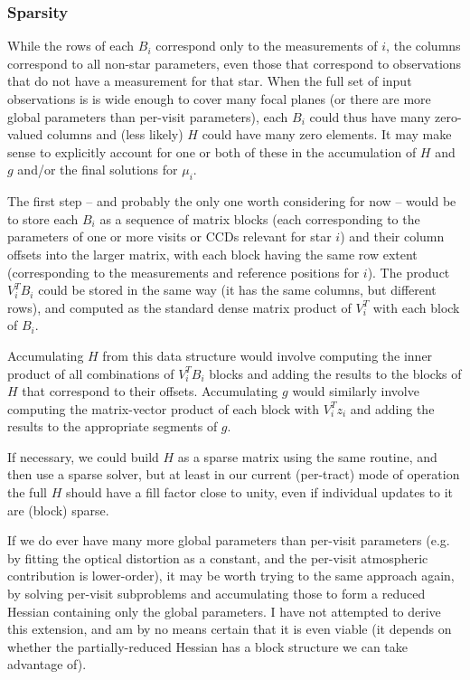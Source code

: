 \subsubsection{Sparsity}

While the rows of each $B_i$ correspond only to the measurements of  $i$, the columns correspond to all non-star parameters, even those that correspond to observations that do not have a measurement for that star.
When the full set of input observations is is wide enough to cover many focal planes (or there are more global parameters than per-visit parameters), each $B_i$ could thus have many zero-valued columns and (less likely) $H$ could have many zero elements.
It may make sense to explicitly account for one or both of these in the accumulation of $H$ and $g$ and/or the final solutions for $\mu_i$.

The first step -- and probably the only one worth considering for now -- would be to store each $B_i$ as a sequence of matrix blocks (each corresponding to the parameters of one or more visits or CCDs relevant for star $i$) and their column offsets into the larger matrix, with each block having the same row extent (corresponding to the measurements and reference positions for $i$).
The product $V_i^T B_i$ could be stored in the same way (it has the same columns, but different rows), and computed as the standard dense matrix product of $V_i^T$ with each block of $B_i$.

Accumulating $H$ from this data structure would involve computing the inner product of all combinations of $V_i^T B_i$ blocks and adding the results to the blocks of $H$ that correspond to their offsets.
Accumulating $g$ would similarly involve computing the matrix-vector product of each block with $V_i^T z_i$ and adding the results to the appropriate segments of $g$.

If necessary, we could build $H$ as a sparse matrix using the same routine, and then use a sparse solver, but at least in our current (per-tract) mode of operation the full $H$ should have a fill factor close to unity, even if individual updates to it are (block) sparse.

If we do ever have many more global parameters than per-visit parameters (e.g. by fitting the optical distortion as a constant, and the per-visit atmospheric contribution is lower-order), it may be worth trying to the same approach again, by solving per-visit subproblems and accumulating those to form a reduced Hessian containing only the global parameters.
I have not attempted to derive this extension, and am by no means certain that it is even viable (it depends on whether the partially-reduced Hessian has a block structure we can take advantage of).

